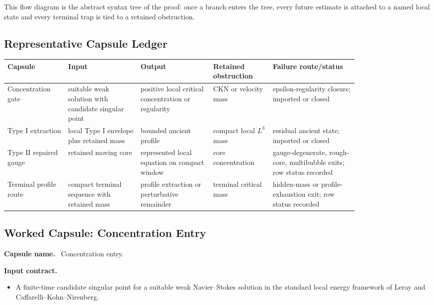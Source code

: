 \documentclass[11pt]{amsart}
\newcommand{\capsulefield}[1]{\par\smallskip\noindent\textbf{#1.}\ }
\begin{document}
This flow diagram is the abstract syntax tree of the proof: once a branch enters
the tree, every future estimate is attached to a named local state and every
terminal trap is tied to a retained obstruction.

\subsection{Representative Capsule Ledger}

\begin{center}
\scriptsize
\begin{longtable}{@{}p{0.14\linewidth}p{0.17\linewidth}p{0.17\linewidth}p{0.14\linewidth}p{0.20\linewidth}@{}}
\toprule
Capsule & Input & Output & Retained obstruction & Failure route/status \\
\midrule
Concentration gate & suitable weak solution with candidate singular point & positive local critical concentration or regularity & CKN or velocity mass & epsilon-regularity closure; imported or closed \\
Type I extraction & local Type I envelope plus retained mass & bounded ancient profile & compact local \(L^3\) mass & residual ancient state; imported or closed \\
Type II repaired gauge & retained moving core & represented local equation on compact window & core concentration & gauge-degenerate, rough-core, multibubble exits; row status recorded \\
Terminal profile route & compact terminal sequence with retained mass & profile extraction or perturbative remainder & terminal critical mass & hidden-mass or profile-exhaustion exit; row status recorded \\
\bottomrule
\end{longtable}
\end{center}

\subsection{Worked Capsule: Concentration Entry}

\capsulefield{Capsule name}
Concentration entry.

\capsulefield{Input contract}
\begin{itemize}
  \item A finite-time candidate singular point for a suitable weak Navier--Stokes solution in the standard local energy framework of Leray and Caffarelli--Kohn--Nirenberg.
\end{itemize}
\end{document}
